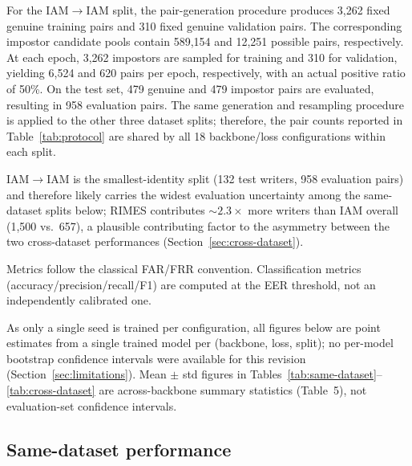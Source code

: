 For the IAM$\to$IAM split, the pair-generation procedure produces 3,262 fixed genuine training pairs and 310 fixed genuine validation pairs. The corresponding impostor candidate pools contain 589,154 and 12,251 possible pairs, respectively. At each epoch, 3,262 impostors are sampled for training and 310 for validation, yielding 6,524 and 620 pairs per epoch, respectively, with an actual positive ratio of 50\%. On the test set, 479 genuine and 479 impostor pairs are evaluated, resulting in 958 evaluation pairs. The same generation and resampling procedure is applied to the other three dataset splits; therefore, the pair counts reported in Table~\ref{tab:protocol} are shared by all 18 backbone/loss configurations within each split.

IAM$\to$IAM is the smallest-identity split (132 test writers, 958 evaluation pairs) and therefore likely carries the widest evaluation uncertainty among the same-dataset splits below; RIMES contributes $\sim2.3\times$ more writers than IAM overall (1{,}500 vs.\ 657), a plausible contributing factor to the asymmetry between the two cross-dataset performances (Section~\ref{sec:cross-dataset}).

Metrics follow the classical FAR/FRR convention. Classification metrics (accuracy/precision/recall/F1) are computed at the EER threshold, not an independently calibrated one.

As only a single seed is trained per configuration, all figures below are point estimates from a single trained model per (backbone, loss, split); no per-model bootstrap confidence intervals were available for this revision (Section~\ref{sec:limitations}). Mean $\pm$ std figures in Tables~\ref{tab:same-dataset}--\ref{tab:cross-dataset} are across-backbone summary statistics (Table~5), not evaluation-set confidence intervals.


\subsection{Same-dataset performance}
\label{sec:same-dataset}

